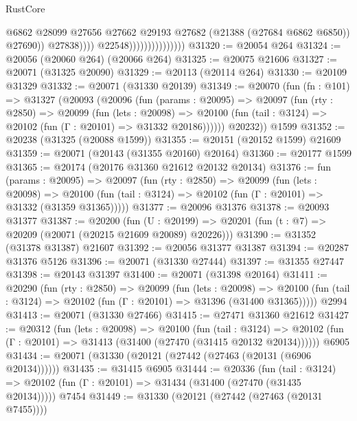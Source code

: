 \begin{lexlean}{RustCore}
\begin{coremodule}
                                              @6862
                                              @28099
                                              @27656
                                              @27662
                                              @29193
                                              @27682
                                              (@21388 (@27684 @6862 @6850))
                                              @27690))
                                          @27838))))
                                  @22548)))))))))))))))
@31320 := @20054 @264
@31324 := @20056 (@20060 @264) (@20066 @264)
@31325 := @20075 @21606
@31327 := @20071 (@31325 @20090)
@31329 := @20113 (@20114 @264)
@31330 := @20109 @31329
@31332 := @20071 (@31330 @20139)
@31349 := @20070
    (fun (fn : @101) =>
    @31327
      (@20093
        (@20096
          (fun (params : @20095) =>
          @20097
            (fun (rty : @2850) =>
            @20099
              (fun (lets : @20098) =>
              @20100 (fun (tail : @3124) => @20102 (fun (Γ : @20101) => @31332 @20186))))))
        @20232))
    @1599
@31352 := @20238 (@31325 (@20088 @1599))
@31355 := @20151 (@20152 @1599) @21609
@31359 := @20071 (@20143 (@31355 @20160) @20164)
@31360 := @20177 @1599
@31365 := @20174 (@20176 @31360 @21612 @20132 @20134)
@31376 := fun (params : @20095) =>
  @20097
    (fun (rty : @2850) =>
    @20099
      (fun (lets : @20098) =>
      @20100 (fun (tail : @3124) => @20102 (fun (Γ : @20101) => @31332 (@31359 @31365)))))
@31377 := @20096 @31376
@31378 := @20093 @31377
@31387 := @20200
    (fun (U : @20199) => @20201 (fun (t : @7) => @20209 (@20071 (@20215 @21609 @20089) @20226)))
@31390 := @31352 (@31378 @31387) @21607
@31392 := @20056 @31377 @31387
@31394 := @20287 @31376 @5126
@31396 := @20071 (@31330 @27444)
@31397 := @31355 @27447
@31398 := @20143 @31397
@31400 := @20071 (@31398 @20164)
@31411 := @20290
    (fun (rty : @2850) =>
    @20099
      (fun (lets : @20098) =>
      @20100 (fun (tail : @3124) => @20102 (fun (Γ : @20101) => @31396 (@31400 @31365)))))
    @2994
@31413 := @20071 (@31330 @27466)
@31415 := @27471 @31360 @21612
@31427 := @20312
    (fun (lets : @20098) =>
    @20100
      (fun (tail : @3124) =>
      @20102 (fun (Γ : @20101) => @31413 (@31400 (@27470 (@31415 @20132 @20134))))))
    @6905
@31434 := @20071 (@31330 (@20121 (@27442 (@27463 (@20131 (@6906 @20134))))))
@31435 := @31415 @6905
@31444 := @20336
    (fun (tail : @3124) => @20102 (fun (Γ : @20101) => @31434 (@31400 (@27470 (@31435 @20134)))))
    @7454
@31449 := @31330 (@20121 (@27442 (@27463 (@20131 @7455))))

\end{coremodule}
\end{lexlean}
